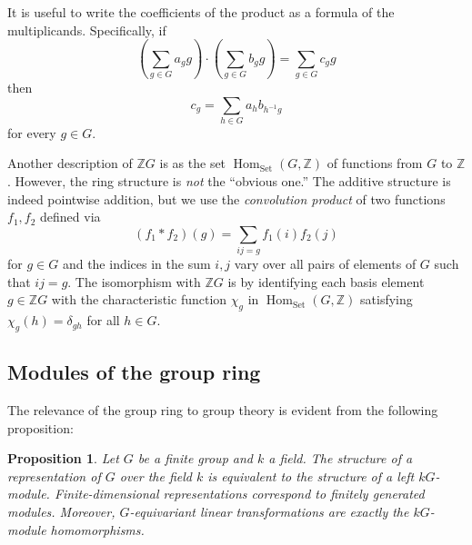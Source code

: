 \documentclass[12pt]{article}
\theoremstyle{plain}
\newtheorem{proposition}[theorem]{Proposition}
\theoremstyle{definition}
\theoremstyle{remark}
\numberwithin{equation}{section}
\begin{document}
It is useful to write the coefficients of the product as a formula of
the multiplicands.  Specifically, if
\[
\left( \sum_{g \in G} a_g g \right) \cdot
\left( \sum_{g \in G} b_g g \right)
= \sum_{g \in G} c_g g
\]
then
\[
c_g = \sum_{h \in G} a_hb_{h^{-1}g}
\]
for every $g \in G$.

Another description of $\mathbb{Z}G$ is as the set
$\operatorname{Hom}_{\mathrm{Set}}(G,\mathbb{Z})$
of functions from $G$ to $\mathbb{Z}$.
However, the ring structure is \emph{not} the ``obvious one.''
The additive structure is indeed pointwise addition,
but we use the \emph{convolution product}
of two functions $f_1,f_2$ defined via
\[
(f_1 \ast f_2)(g) = \sum_{ij=g} f_1(i)f_2(j)
\]
for $g \in G$ and the indices in the sum $i,j$
vary over all pairs of elements of $G$ such that $ij=g$.
The isomorphism with $\mathbb{Z}G$ is by identifying each basis element
$g \in \mathbb{Z}G$ with the characteristic function $\chi_g$
in $\operatorname{Hom}_{\mathrm{Set}}(G,\mathbb{Z})$
satisfying $\chi_g(h) = \delta_{gh}$ for all $h \in G$.

\subsection{Modules of the group ring}

The relevance of the group ring to group theory is evident from the
following proposition:

\begin{proposition} \label{prop:equivalence}
Let $G$ be a finite group and $k$ a field.
The structure of a representation of $G$ over the field $k$
is equivalent to the structure of a left $kG$-module.
Finite-dimensional representations correspond to
finitely generated modules.
Moreover, $G$-equivariant linear transformations are
exactly the $kG$-module homomorphisms.
\end{proposition}
\end{document}
